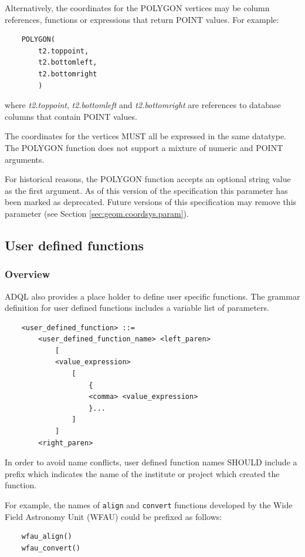 \documentclass[11pt,a4paper]{ivoa}
\newcommand{\SectionSee}[1]{(see Section \ref{#1})\xspace}
\begin{document}
Alternatively, the coordinates for the POLYGON vertices may be column references,
functions or expressions that return POINT values.
For example:
\begin{verbatim}
    POLYGON(
        t2.toppoint,
        t2.bottomleft,
        t2.bottomright
        )
\end{verbatim}
\noindent
where \textit{t2.toppoint}, \textit{t2.bottomleft} and \textit{t2.bottomright}
are references to database columns that contain POINT values.

The coordinates for the vertices MUST all be expressed in the same datatype.
The POLYGON function does not support a mixture of numeric and POINT
arguments.

For historical reasons, the POLYGON function accepts an optional string
value as the first argument.
As of this version of the specification this parameter has been
marked as deprecated.
Future versions of this specification may remove this parameter
\SectionSee{sec:geom.coordsys.param}.





\subsection{User defined functions}
\label{sec:user.functions}
\subsubsection{Overview}

ADQL also provides a place holder to define user specific functions. The grammar
definition for user defined functions includes a variable list of parameters.

\begin{verbatim}
    <user_defined_function> ::=
        <user_defined_function_name> <left_paren>
            [
            <value_expression>
                [
                    {
                    <comma> <value_expression>
                    }...
                ]
            ]
        <right_paren>
\end{verbatim}

In order to avoid name conflicts, user defined function names SHOULD include
a prefix which indicates the name of the institute or project which created
the function.

For example, the names of \verb:align: and \verb:convert: functions developed
by the Wide Field Astronomy Unit (WFAU) could be prefixed as follows:
\begin{verbatim}
    wfau_align()
    wfau_convert()
\end{verbatim}
\end{document}
